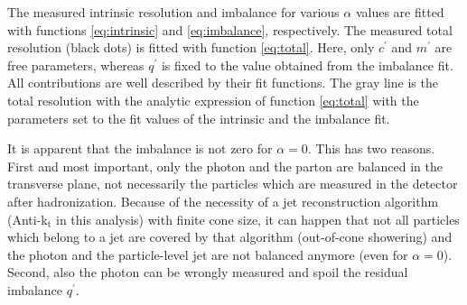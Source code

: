 The measured intrinsic resolution and imbalance for various $\alpha$ values are fitted with functions \eqref{eq:intrinsic} and \eqref{eq:imbalance}, respectively.
The measured total resolution (black dots) is fitted with function \eqref{eq:total}. Here, only $c^{\prime}$ and $m^{\prime}$ are free parameters, 
whereas $q^{\prime}$ is fixed to the value obtained from the imbalance fit. 
All contributions are well described by their fit functions. 
The gray line is the total resolution with the analytic expression of function \eqref{eq:total} with the parameters set to the fit values of the intrinsic and the imbalance fit. 

It is apparent that the imbalance is not zero for $\alpha=0$. This has two reasons.
First and most important, only the photon and the parton are balanced in the transverse plane, 
not necessarily the particles which are measured in the detector after hadronization. 
Because of the necessity of a jet reconstruction algorithm (Anti-k$_{\text{t}}$ in this analysis) with finite cone size, 
it can happen that not all particles which belong to a jet are covered by 
that algorithm (out-of-cone showering) and the photon and the particle-level jet are not balanced anymore (even for $\alpha = 0$). Second, also the photon \pt can 
be wrongly measured and spoil the residual imbalance $q^{\prime}$. 

